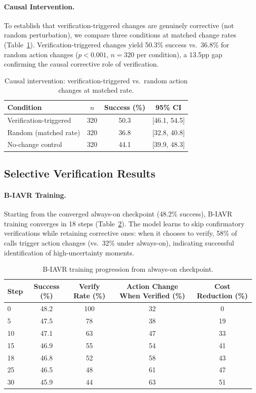 \documentclass[11pt]{article}
\begin{document}
\paragraph{Causal Intervention.}
To establish that verification-triggered changes are genuinely corrective (not random perturbation), we compare three conditions at matched change rates (Table~\ref{tab:causal}). Verification-triggered changes yield 50.3\% success vs.\ 36.8\% for random action changes ($p < 0.001$, $n = 320$ per condition), a 13.5pp gap confirming the causal corrective role of verification.

\begin{table}[h]
\centering
\caption{Causal intervention: verification-triggered vs.\ random action changes at matched rate.}
\label{tab:causal}
\begin{tabular}{lccc}
\toprule
Condition & $n$ & Success (\%) & 95\% CI \\
\midrule
Verification-triggered & 320 & 50.3 & [46.1, 54.5] \\
Random (matched rate) & 320 & 36.8 & [32.8, 40.8] \\
No-change control & 320 & 44.1 & [39.9, 48.3] \\
\bottomrule
\end{tabular}
\end{table}

\subsection{Selective Verification Results}

\paragraph{B-IAVR Training.}
Starting from the converged always-on checkpoint (48.2\% success), B-IAVR training converges in 18 steps (Table~\ref{tab:biavr_training}). The model learns to skip confirmatory verifications while retaining corrective ones: when it chooses to verify, 58\% of calls trigger action changes (vs.\ 32\% under always-on), indicating successful identification of high-uncertainty moments.

\begin{table}[h]
\centering
\caption{B-IAVR training progression from always-on checkpoint.}
\label{tab:biavr_training}
\begin{tabular}{lcccc}
\toprule
Step & Success (\%) & Verify Rate (\%) & Action Change When Verified (\%) & Cost Reduction (\%) \\
\midrule
0 & 48.2 & 100 & 32 & 0 \\
5 & 47.5 & 78 & 38 & 19 \\
10 & 47.1 & 63 & 47 & 33 \\
15 & 46.9 & 55 & 54 & 41 \\
18 & 46.8 & 52 & 58 & 43 \\
25 & 46.5 & 48 & 61 & 47 \\
30 & 45.9 & 44 & 63 & 51 \\
\bottomrule
\end{tabular}
\end{table}
\end{document}

